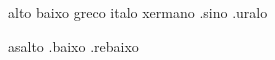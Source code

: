 % 
%

\begin{prefixos}
alto baixo
greco italo xermano .sino .uralo
\end{prefixos}

\begin{3a_ppi}
asalto .baixo .rebaixo
\end{3a_ppi}
\endinput
